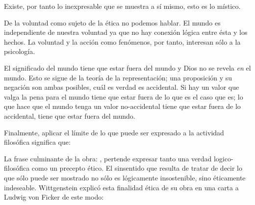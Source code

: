Existe, por tanto lo inexpresable que se muestra a sí mismo, esto es lo
místico.\autocite[cf.~][6.522]{tractatus}

De la voluntad como sujeto de la ética no podemos
hablar\autocite[cf.~][6.423]{tractatus}. El mundo es independiente de nuestra
voluntad ya que no hay conexión lógica entre ésta y los hechos.
La voluntad y la acción como fenómenos, por tanto, interesan sólo a la
psicología.\autocite[cf.~][p.171 \S3]{IWT}

El significado del mundo tiene que estar fuera del
mundo\autocite[cf.~][6.41]{tractatus} y Dios no se revela \emph{en} el
mundo\autocite[cf.~][6.432]{tractatus}. 
Esto se sigue de la teoría de la representación; una proposición y su negación
son ambas posibles, cuál es verdad es accidental.\autocite[cf.~][p.170 \S4]{IWT}
Si hay un valor que valga la pena para el mundo tiene que estar fuera de lo que
es el caso que es; lo que hace que el mundo tenga un valor no-accidental tiene
que estar fuera de lo accidental, tiene que estar fuera del
mundo.\autocite[cf.~][6.41]{tractatus} 

Finalmente, aplicar el límite de lo que puede ser expresado a la actividad
filosófica significa que:

  La frase culminante de la obra: , pertende expresar tanto una verdad
  logico-filosófica como un precepto ético. El sinsentido que resulta de tratar
  de decir lo que sólo puede ser mostrado no sólo es lógicamente insostenible,
  sino éticamente indeseable.\autocite[cf.~][p.~156]{monk} Wittgenstein explicó
  esta finalidad ética de su obra en una carta a Ludwig von Ficker de este modo:

